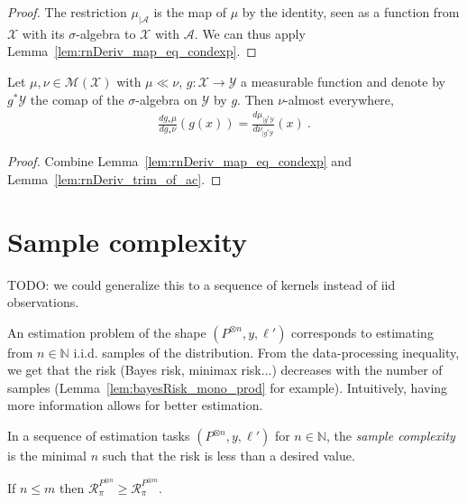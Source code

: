\begin{proof}\mathlibok
{}
The restriction $\mu_{| \mathcal A}$ is the map of $\mu$ by the identity, seen as a function from $\mathcal X$ with its $\sigma$-algebra to $\mathcal X$ with $\mathcal{A}$.
We can thus apply Lemma~\ref{lem:rnDeriv_map_eq_condexp}.
\end{proof}


\begin{lemma}
  \label{lem:rnDeriv_map_eq_rnDeriv_trim}
  \uses{}
  Let $\mu, \nu \in \mathcal M(\mathcal X)$ with $\mu \ll \nu$, $g : \mathcal X \to \mathcal Y$ a measurable function and denote by $g^* \mathcal Y$ the comap of the $\sigma$-algebra on $\mathcal Y$ by $g$.
  Then $\nu$-almost everywhere,
  \begin{align*}
  \frac{d g_*\mu}{d g_*\nu}(g(x)) = \frac{d \mu_{| g^* \mathcal Y}}{d \nu_{| g^* \mathcal Y}}(x)
  \: .
  \end{align*}
\end{lemma}

\begin{proof}%
{}
Combine Lemma~\ref{lem:rnDeriv_map_eq_condexp} and Lemma~\ref{lem:rnDeriv_trim_of_ac}.
\end{proof}

\section{Sample complexity}

TODO: we could generalize this to a sequence of kernels instead of iid observations.

An estimation problem of the shape $(P^{\otimes n}, y, \ell')$ corresponds to estimating from $n \in \mathbb{N}$ i.i.d. samples of the distribution. From the data-processing inequality, we get that the risk (Bayes risk, minimax risk...) decreases with the number of samples (Lemma~\ref{lem:bayesRisk_mono_prod} for example).
Intuitively, having more information allows for better estimation.

In a sequence of estimation tasks $(P^{\otimes n}, y, \ell')$ for $n \in \mathbb{N}$, the \emph{sample complexity} is the minimal $n$ such that the risk is less than a desired value.

\begin{lemma}
  \label{lem:bayesRisk_mono_prod}
  If $n \le m$ then $\mathcal R_\pi^{P^{\otimes n}} \ge \mathcal R_\pi^{P^{\otimes m}}$.
\end{lemma}

